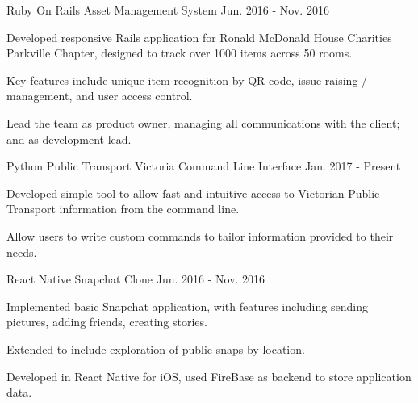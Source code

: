 \begin{cventries}
  \cventry
    {Ruby On Rails}
    {Asset Management System}
    {}
    {Jun. 2016 - Nov. 2016}
    {
      \begin{cvitems}
        \item {Developed responsive Rails application for Ronald McDonald House Charities Parkville Chapter, designed to track over 1000 items across 50 rooms.}
        \item {Key features include unique item recognition by QR code, issue raising / management, and user access control.}
        \item {Lead the team as product owner, managing all communications with the client; and as development lead.}
      \end{cvitems}
    }
  \cventry
    {Python}
    {Public Transport Victoria Command Line Interface}
    {}
    {Jan. 2017 - Present}
    {
      \begin{cvitems}
      	\item {Developed simple tool to allow fast and intuitive access to Victorian Public Transport information from the command line.}
        \item {Allow users to write custom commands to tailor information provided to their needs.}
      \end{cvitems}
    }
   \cventry
    {React Native}
    {Snapchat Clone}
    {}
    {Jun. 2016 - Nov. 2016}
    {
      \begin{cvitems}
      	\item {Implemented basic Snapchat application, with features including sending pictures, adding friends, creating stories.}
      	\item {Extended to include exploration of public snaps by location.}
      	\item {Developed in React Native for iOS, used FireBase as backend to store application data.}
      \end{cvitems}
    }
\end{cventries}
\vspace{-5mm}